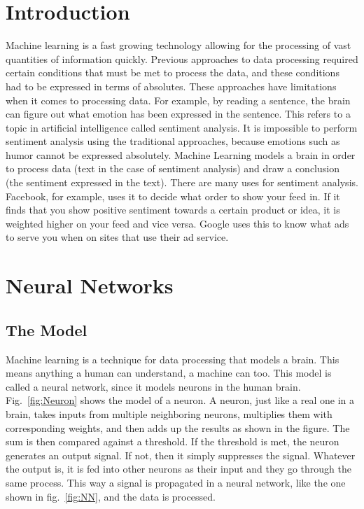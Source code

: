 \documentclass[12pt]{article}
\begin{document}
    \section{Introduction}
    Machine learning is a fast growing technology allowing for the processing of vast quantities of information quickly. Previous approaches to data processing required certain conditions that must be met to process the data, and these conditions had to be expressed in terms of absolutes. These approaches have limitations when it comes to processing data. For example, by reading a sentence, the brain can figure out what emotion has been expressed in the sentence. This refers to a topic in artificial intelligence called sentiment analysis. It is impossible to perform sentiment analysis using the traditional approaches, because emotions such as humor cannot be expressed absolutely. Machine Learning models a brain\autocite{MLVision} in order to process data (text in the case of sentiment analysis) and draw a conclusion (the sentiment expressed in the text).\autocite{GoldenAgeArchitecture} There are many uses for sentiment analysis. Facebook, for example, uses it to decide what order to show your feed in. If it finds that you show positive sentiment towards a certain product or idea, it is weighted higher on your feed and vice versa. Google uses this to know what ads to serve you when on sites that use their ad service.

    \section{Neural Networks}
    \subsection{The Model}
    Machine learning is a technique for data processing that models a brain. This means anything a human can understand, a machine can too. This model is called a neural network, since it models neurons in the human brain. Fig.~\ref{fig:Neuron} shows the model of a neuron. A neuron, just like a real one in a brain, takes inputs from multiple neighboring neurons, multiplies them with corresponding weights, and then adds up the results as shown in the figure. The sum is then compared against a threshold. If the threshold is met, the neuron generates an output signal. If not, then it simply suppresses the signal. Whatever the output is, it is fed into other neurons as their input and they go through the same process. This way a signal is propagated in a neural network, like the one shown in fig.~\ref{fig:NN}, and the data is processed.
\end{document}

